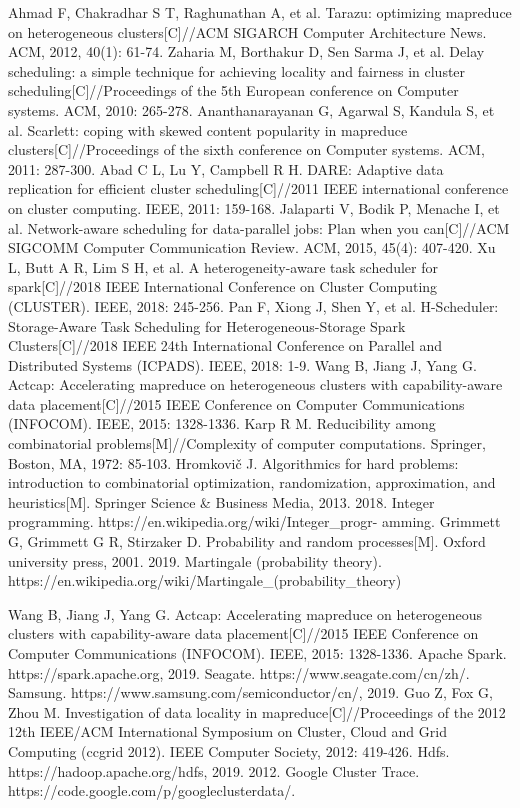 \documentclass[conference]{IEEEtran}
\begin{document}
\begin{thebibliography}{00}
 Ahmad F, Chakradhar S T, Raghunathan A, et al. Tarazu: optimizing mapreduce on heterogeneous clusters[C]//ACM SIGARCH Computer Architecture News. ACM, 2012, 40(1): 61-74.
 Zaharia M, Borthakur D, Sen Sarma J, et al. Delay scheduling: a simple technique for achieving locality and fairness in cluster scheduling[C]//Proceedings of the 5th European conference on Computer systems. ACM, 2010: 265-278.
 Ananthanarayanan G, Agarwal S, Kandula S, et al. Scarlett: coping with skewed content popularity in mapreduce clusters[C]//Proceedings of the sixth conference on Computer systems. ACM, 2011: 287-300.
 Abad C L, Lu Y, Campbell R H. DARE: Adaptive data replication for efficient cluster scheduling[C]//2011 IEEE international conference on cluster computing. IEEE, 2011: 159-168.
 Jalaparti V, Bodik P, Menache I, et al. Network-aware scheduling for data-parallel jobs: Plan when you can[C]//ACM SIGCOMM Computer Communication Review. ACM, 2015, 45(4): 407-420.
 Xu L, Butt A R, Lim S H, et al. A heterogeneity-aware task scheduler for spark[C]//2018 IEEE International Conference on Cluster Computing (CLUSTER). IEEE, 2018: 245-256.
 Pan F, Xiong J, Shen Y, et al. H-Scheduler: Storage-Aware Task Scheduling for Heterogeneous-Storage Spark Clusters[C]//2018 IEEE 24th International Conference on Parallel and Distributed Systems (ICPADS). IEEE, 2018: 1-9.
 Wang B, Jiang J, Yang G. Actcap: Accelerating mapreduce on heterogeneous clusters with capability-aware data placement[C]//2015 IEEE Conference on Computer Communications (INFOCOM). IEEE, 2015: 1328-1336.
 Karp R M. Reducibility among combinatorial problems[M]//Complexity of computer computations. Springer, Boston, MA, 1972: 85-103.
 Hromkovič J. Algorithmics for hard problems: introduction to combinatorial optimization, randomization, approximation, and heuristics[M]. Springer Science \& Business Media, 2013.
 2018. Integer programming.     https://en.wikipedia.org/wiki/Integer\_progr- amming.
 Grimmett G, Grimmett G R, Stirzaker D. Probability and random processes[M]. Oxford university press, 2001.
 2019. Martingale (probability theory). https://en.wikipedia.org/wiki/Martingale\_(probability\_theory)

 Wang B, Jiang J, Yang G. Actcap: Accelerating mapreduce on heterogeneous clusters with capability-aware data placement[C]//2015 IEEE Conference on Computer Communications (INFOCOM). IEEE, 2015: 1328-1336.
 Apache Spark. https://spark.apache.org, 2019.
Seagate. https://www.seagate.com/cn/zh/.
Samsung. https://www.samsung.com/semiconductor/cn/, 2019.
Guo Z, Fox G, Zhou M. Investigation of data locality in mapreduce[C]//Proceedings of the 2012 12th IEEE/ACM International Symposium on Cluster, Cloud and Grid Computing (ccgrid 2012). IEEE Computer Society, 2012: 419-426. 
 Hdfs. https://hadoop.apache.org/hdfs, 2019.
 2012. Google Cluster Trace. https://code.google.com/p/googleclusterdata/.


\end{thebibliography}
\end{document}
